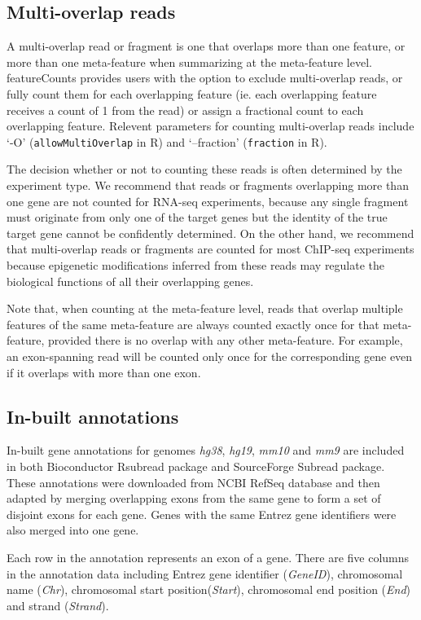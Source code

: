 \documentclass[12pt]{report}
\newcommand{\code}[1]{{\small\texttt{#1}}}
\newcommand{\Subread}{\textsf{Subread}}
\newcommand{\Rsubread}{\textsf{Rsubread}}
\newcommand{\featureCounts}{\textsf{featureCounts}}
\newcommand{\R}{\textsf{R}}
\begin{document}
\subsection{Multi-overlap reads}

A multi-overlap read or fragment is one that overlaps more than one feature, or more than one meta-feature when summarizing at the meta-feature level. {\featureCounts} provides users with the option to exclude multi-overlap reads, or fully count them for each overlapping feature (ie. each overlapping feature receives a count of 1 from the read)  or assign a fractional count to each overlapping feature.
Relevent parameters for counting multi-overlap reads include `-O' (\code{allowMultiOverlap} in \R) and `--fraction' (\code{fraction} in \R).

The decision whether or not to counting these reads is often determined by the experiment type. We recommend that reads or fragments overlapping more than one gene are not counted for RNA-seq experiments, because any single fragment must originate from only one of the target genes but the identity of the true target gene cannot be confidently determined. On the other hand, we recommend that multi-overlap reads or fragments are counted for most ChIP-seq experiments because epigenetic modifications inferred from these reads may regulate the biological functions of all their overlapping genes.

Note that, when counting at the meta-feature level, reads that overlap multiple features of the same meta-feature are always counted exactly once for that meta-feature, provided there is no overlap with any other meta-feature. For example, an exon-spanning read will be counted only once for the corresponding gene even if it overlaps with more than one exon.

\subsection{In-built annotations}

In-built gene annotations for genomes \emph{hg38}, \emph{hg19}, \emph{mm10} and \emph{mm9} are included in both Bioconductor {\Rsubread} package and SourceForge {\Subread} package.
These annotations were downloaded from NCBI RefSeq database and then adapted by merging overlapping exons from the same gene to form a set of disjoint exons for each gene.
Genes with the same Entrez gene identifiers were also merged into one gene.

Each row in the annotation represents an exon of a gene. There are five columns in the annotation data including Entrez gene identifier (\emph{GeneID}), chromosomal name (\emph{Chr}), chromosomal start position(\emph{Start}), chromosomal end position (\emph{End}) and strand (\emph{Strand}).
\end{document}
